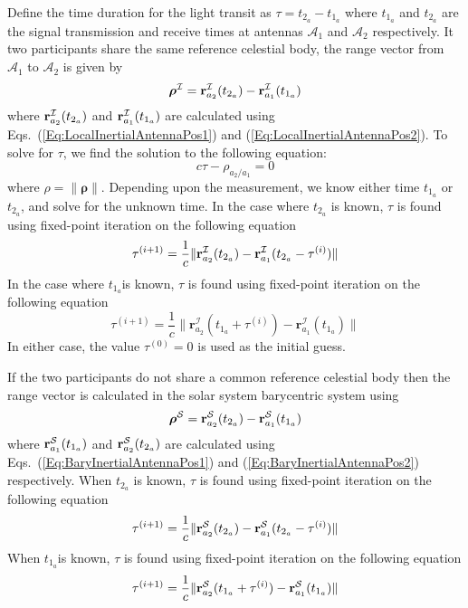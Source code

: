 Define the time duration for the light transit as $\tau = t_{2_{a}} - t_{1_{a}}$ where $t_{1_{a}}$ and $t_{2_{a}}$ are the signal transmission and receive times at antennas $\mathcal{A}_1$ and $\mathcal{A}_2$ respectively. It two participants share the same reference celestial body, the range vector from $\mathcal{A}_1$ to $\mathcal{A}_2$ is given by
%
\begin{equation}
     \boldsymbol{\rho}^\mcI= \mathbf{r}_{a_{2}}^{\mcI}(t_{2_{a}}) - \mathbf{r}_{a_{1}}^{\mcI}(t_{1_{a}}) \label{Eq:RangeVecLocalInertial}
\end{equation}
%
where $\mathbf{r}_{a_{2}}^{\mcI}(t_{2_{a}})$ and $\mathbf{r}_{a_{1}}^{\mcI}(t_{1_{a}})$ are calculated using Eqs.~(\ref{Eq:LocalInertialAntennaPos1}) and (\ref{Eq:LocalInertialAntennaPos2}). To solve for $\tau$, we find the solution to the following equation:
%
\begin{equation}
     c\tau - \rho_{a_2/a_1} = 0
\end{equation}
%
where $\rho = \| \boldsymbol{\rho}  \|$. Depending upon the measurement, we know either time $t_{1_{a}}$ or $t_{2_{a}} $, and solve for the unknown time.   In the case where $t_{2_{a}}$ is known, $\tau$ is found using fixed-point iteration on the following equation \cite{Montenbruck:Gill:05}
%
\begin{equation}
   \tau^{(i+1)} = \frac{1}{c}\| \mathbf{r}_{a_{2}}^{\mcI}(t_{2_{a}})  -  \mathbf{r}_{a_{1}}^{\mcI}(t_{2_{a}} - \tau^{(i)}) \|
\end{equation}
%
In the case where $t_{1_{a}}$is known, $\tau$ is found using fixed-point iteration on the following equation
%
\begin{equation}
   \tau^{(i+1)} = \frac{1}{c}\| \mathbf{r}_{a_{2}}^\mathcal{I}(t_{1_{a}}+\tau^{(i)})  -  \mathbf{r}_{a_{1}}^\mathcal{I}(t_{1_{a}}) \|
\end{equation}
%
In either case, the value $\tau^{(0)} = 0$ is used as the initial guess.

If the two participants do not share a common reference celestial body then the range vector is calculated in the solar system barycentric system using
%
 \begin{equation}
     \boldsymbol{\rho}^\mcS = \mathbf{r}_{a_{2}}^{\mcS}(t_{2_{a}}) - \mathbf{r}_{a_{1}}^{\mcS}(t_{1_{a}})\label{Eq:RangeVecBaryInertial}
\end{equation}
%
where $\mathbf{r}_{a_{1}}^{\mcS}(t_{1_{a}})$ and $\mathbf{r}_{a_{2}}^{\mcS}(t_{2_{a}})$ are calculated using Eqs.~(\ref{Eq:BaryInertialAntennaPos1}) and (\ref{Eq:BaryInertialAntennaPos2}) respectively.
When $t_{2_{a}}$ is known, $\tau$ is found using fixed-point iteration on the following equation \cite{Montenbruck:Gill:05}
%
\begin{equation}
   \tau^{(i+1)} = \frac{1}{c}\| \mathbf{r}_{a_{2}}^{\mcS}(t_{2_{a}})  -  \mathbf{r}_{a_{1}}^{\mcS}(t_{2_{a}} - \tau^{(i)}) \|
\end{equation}
%
When $t_{1_{a}}$is known, $\tau$ is found using fixed-point iteration on the following equation
%
\begin{equation}
   \tau^{(i+1)} = \frac{1}{c}\| \mathbf{r}_{a_{2}}^{\mcS}(t_{1_{a}}+\tau^{(i)})  -  \mathbf{r}_{a_{1}}^{\mcS}(t_{1_{a}}) \|
\end{equation}
%

